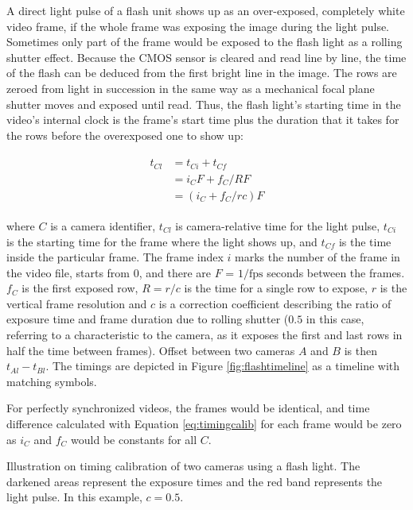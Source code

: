 
A direct light pulse of a flash unit shows up as an over-exposed, completely white video frame, if the whole frame was exposing the image during the light pulse.
Sometimes only part of the frame would be exposed to the flash light as a rolling shutter effect.
Because the CMOS sensor is cleared and read line by line, the time of the flash can be deduced from the first bright line in the image.
The rows are zeroed from light in succession in the same way as a mechanical focal plane shutter moves and exposed until read.
Thus, the flash light's starting time in the video's internal clock is the frame's start time plus the duration that it takes for the rows before the overexposed one to show up:

\begin{align} \begin{split} \label{eq:timingcalib}
t_{Cl} &= t_{Ci} + t_{Cf} \\
&= i_C  F + f_C / R F \\
&= (i_C + f_C / r c) F
\end{split} \end{align}

where $C$ is a camera identifier, $t_{Cl}$ is camera-relative time for the light pulse, $t_{Ci}$ is the starting time for the frame where the light shows up, and $t_{Cf}$ is the time inside the particular frame.
The frame index $i$ marks the number of the frame in the video file, starts from 0, and there are $F$ = $1/\text{fps}$ seconds between the frames.
$f_C$ is the first exposed row, $R = r / c$ is the time for a single row to expose, $r$ is the vertical frame resolution and $c$ is a correction coefficient describing the ratio of exposure time and frame duration due to rolling shutter ($0.5$ in this case, referring to a characteristic to the camera, as it exposes the first and last rows in half the time between frames).
Offset between two cameras $A$ and $B$ is then $t_{Al} - t_{Bl}$.
The timings are depicted in Figure \ref{fig:flashtimeline} as a timeline with matching symbols.

For perfectly synchronized videos, the frames would be identical, and time difference calculated with Equation \ref{eq:timingcalib} for each frame would be zero as $i_C$ and $f_C$ would be constants for all $C$.

{Illustration on timing calibration of two cameras using a flash light.
The darkened areas represent the exposure times and the red band represents the light pulse.
In this example, $c = 0.5$.
}

